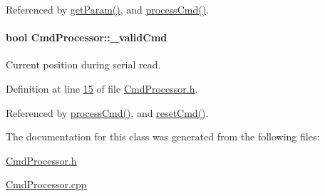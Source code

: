 Referenced by \hyperlink{_cmd_processor_8cpp_source_l00146}{getParam()}, and \hyperlink{_cmd_processor_8cpp_source_l00092}{processCmd()}.

\hypertarget{class_cmd_processor_a18b0886303779762a37096d6446aefa6}{
\paragraph[{\_\-validCmd}]{\setlength{\rightskip}{0pt plus 5cm}bool {\bf CmdProcessor::\_\-validCmd}}\hfill}
\label{class_cmd_processor_a18b0886303779762a37096d6446aefa6}


Current position during serial read. 



Definition at line \hyperlink{_cmd_processor_8h_source_l00015}{15} of file \hyperlink{_cmd_processor_8h_source}{CmdProcessor.h}.



Referenced by \hyperlink{_cmd_processor_8cpp_source_l00092}{processCmd()}, and \hyperlink{_cmd_processor_8cpp_source_l00115}{resetCmd()}.



The documentation for this class was generated from the following files:\begin{DoxyCompactItemize}
\item 
\hyperlink{_cmd_processor_8h}{CmdProcessor.h}\item 
\hyperlink{_cmd_processor_8cpp}{CmdProcessor.cpp}\end{DoxyCompactItemize}
